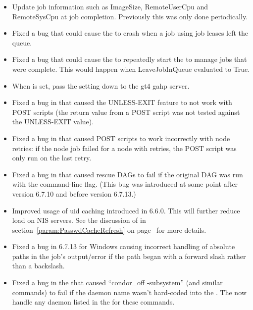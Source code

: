 \begin{itemize}
\item Update job information such as ImageSize, RemoteUserCpu and RemoteSysCpu 
at job completion.  Previously this was only done periodically.

\item Fixed a bug that could cause the  to crash when
a job using job leases left the queue.

\item Fixed a bug that could cause the  to repeatedly start
the  to manage jobs that were complete. This would
happen when LeaveJobInQueue evaluated to True.

\item When  is set, pass the setting
down to the gt4 gahp server.

\item Fixed a bug in  that caused the UNLESS-EXIT
feature to not work with POST scripts (the return value from a POST
script was not tested against the UNLESS-EXIT value).

\item Fixed a bug in  that caused POST scripts to work
incorrectly with node retries:  if the node job failed for a node
with retries, the POST script was only run on the last retry.

\item Fixed a bug in  that caused rescue DAGs to fail
if the original DAG was run with the  command-line flag.
(This bug was introduced at some point after version 6.7.10 and before
version 6.7.13.)

\item Improved usage of uid caching introduced in 6.6.0.  This will
further reduce load on NIS servers.  See the discussion of
 in
section~\ref{param:PasswdCacheRefresh} on
page~\pageref{param:PasswdCacheRefresh} for more details.

\item Fixed a bug in 6.7.13 for Windows causing incorrect handling of
absolute paths in the job's output/error if the path began with a
forward slash rather than a backslash.

\item Fixed a bug in the  that caused ``condor\_off
-subsystem'' (and similar commands) to fail if the daemon name wasn't
hard-coded into the .  The  now handle
any daemon listed in the  for these commands.


\end{itemize}
